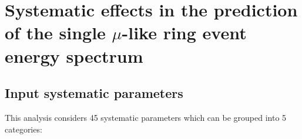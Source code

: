 \clearpage

\section {Systematic effects in the prediction of the single $\mu$-like ring event energy spectrum}
\label{sec:systematics}


\subsection {Input systematic parameters}
\label{sec:systematics:inputs}

This analysis considers 45 systematic parameters which can be grouped into 5 categories:

